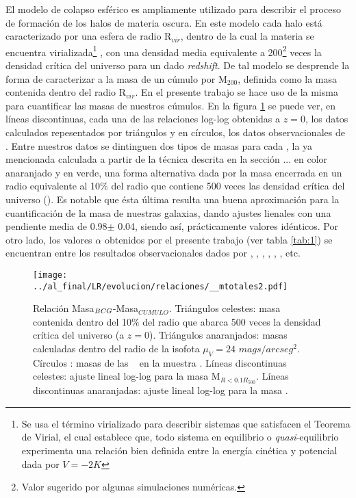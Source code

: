 El modelo de colapso esf\'erico es ampliamente utilizado para describir el proceso de formaci\'on de los halos
de materia oscura. En este modelo cada halo est\'a caracterizado por una esfera de radio R$_{vir}$,
dentro de la cual la materia se encuentra virializada\footnote{Se usa el t\'ermino virializado para describir sistemas que satisfacen el Teorema de Virial, el cual
establece que, todo sistema en equilibrio o \textit{quasi}-equilibrio
experimenta una relaci\'on bien definida entre la energ\'ia cin\'etica y potencial dada por $V=-2K$}
, con una densidad media equivalente a 200\footnote{Valor
sugerido por algunas simulaciones num\'ericas.} veces la densidad cr\'itica del universo para un dado \textit{redshift}. 
De tal modelo se desprende la forma de caracterizar a la masa de un c\'umulo por M$_{200}$, definida como la masa
contenida dentro del radio R$_{vir}$.
En el presente trabajo se hace uso de la misma para cuantificar las masas de nuestros c\'umulos.
En la figura \ref{fig:relmtmv} se puede ver, en l\'ineas discontinuas, cada una de las relaciones log-log obtenidas a $z=0$,
los datos calculados repesentados por tri\'angulos y en c\'irculos, los datos observacionales de \cite{kra14}.
Entre nuestros datos se dintinguen dos tipos de masas para
cada \bcg, la ya mencionada calculada a partir de la t\'ecnica
descrita en la secci\'on ... en color anaranjado y en verde, una forma alternativa
dada por la masa encerrada en un radio equivalente al 10$\%$ del radio que contiene
500 veces las densidad cr\'itica del universo (). Es notable
que \'esta \'ultima resulta una buena aproximaci\'on para la cuantificaci\'on de la masa de 
nuestras galaxias, dando ajustes lienales con una pendiente
media de 0.98$\pm$ 0.04, siendo as\'i, pr\'acticamente valores id\'enticos.
Por otro lado, los valores $\alpha$ obtenidos por el presente trabajo
(ver tabla \ref{tab:1}) se encuentran entre los resultados observacionales dados por \cite{lid12}, \cite{bai14}, \cite{bel16},
\cite{sto12}, \cite{mit09}, \cite{zha16}, etc. 


\begin{figure}[H]
 \centering
 \texttt{[image: ../al\_final/LR/evolucion/relaciones/\_\_mtotales2.pdf]}
\caption{Relaci\'on Masa$_{{\it BCG}}$-Masa$_{CUMULO}$. Tri\'angulos celestes: masa contenida dentro del 10$\%$ del 
radio que abarca 500 veces la densidad cr\'itica del universo (a $z=0$). Tri\'angulos anaranjados: masas calculadas dentro del
radio de la isofota $\mu_{V}=24$ $mags/arcseg^{2}$. C\'irculos : masas de las \bcgs~ en la muestra 
\cite{kra14}. L\'ineas discontinuas celestes: ajuste lineal log-log para la masa M$_{R<0.1R_{500}}$.
L\'ineas discontinuas anaranjadas: ajuste lineal log-log para la masa \mvc.}
\label{fig:relmtmv}
\end{figure}


